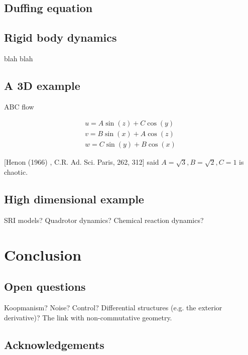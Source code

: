 \documentclass[12pt]{amsart}
\begin{document}
\subsection{Duffing equation}

\subsection{Rigid body dynamics}
blah blah

\subsection{A 3D example}
ABC flow

\begin{align*}
	u = A \sin(z) + C \cos(y) \\
	v = B \sin(x) + A \cos(z) \\
	w = C \sin(y) + B \cos(x)
\end{align*}

[Henon (1966) , C.R. Ad. Sci. Paris, 262, 312]
said $A = \sqrt{3},B = \sqrt{2},C=1$ is chaotic.

\subsection{High dimensional example}
SRI models?  Quadrotor dynamics?  Chemical reaction dynamics?

\section{Conclusion}

\subsection{Open questions}
Koopmanism?  Noise?  Control?  Differential structures (e.g. the exterior derivative)?  The link with non-commutative geometry.

\subsection{Acknowledgements}



\end{document}
